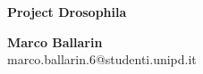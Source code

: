\documentclass{article}
\begin{document}
\begin{center}
    \huge
    \textbf{Project Drosophila}  %
    
    \normalsize
    \vspace{0.4cm}
    \textbf{Marco Ballarin}   \\ %
    marco.ballarin.6@studenti.unipd.it
\end{center}
\newpage
\tableofcontents
\newpage



\newpage
\printbibliography
\end{document}
